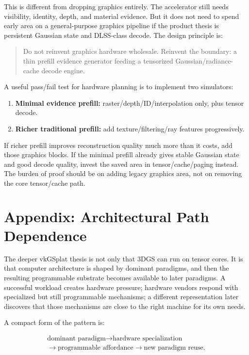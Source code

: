 \documentclass[11pt]{article}
\begin{document}
This is different from dropping graphics entirely. The accelerator still needs
visibility, identity, depth, and material evidence. But it does not need to
spend early area on a general-purpose graphics pipeline if the product thesis
is persistent Gaussian state and DLSS-class decode. The design principle is:

\begin{quote}
Do not reinvent graphics hardware wholesale. Reinvent the boundary: a thin
prefill evidence generator feeding a tensorized Gaussian/radiance-cache decode
engine.
\end{quote}

A useful pass/fail test for hardware planning is to implement two simulators:

\begin{enumerate}
  \item \textbf{Minimal evidence prefill:} raster/depth/ID/interpolation only,
        plus tensor decode.
  \item \textbf{Richer traditional prefill:} add texture/filtering/ray features
        progressively.
\end{enumerate}

If richer prefill improves reconstruction quality much more than it costs, add
those graphics blocks. If the minimal prefill already gives stable Gaussian
state and good decode quality, invest the saved area in tensor/cache/paging
instead. The burden of proof should be on adding legacy graphics area, not on
removing the core tensor/cache path.

\section{Appendix: Architectural Path Dependence}

The deeper vkGSplat thesis is not only that 3DGS can run on tensor cores. It is
that computer architecture is shaped by dominant paradigms, and then the
resulting programmable substrate becomes available to later paradigms. A
successful workload creates hardware pressure; hardware vendors respond with
specialized but still programmable mechanisms; a different representation later
discovers that those mechanisms are close to the right machine for its own
needs.

A compact form of the pattern is:

\[
\begin{gathered}
\text{dominant paradigm}
\rightarrow \text{hardware specialization}\\
\rightarrow \text{programmable affordance}
\rightarrow \text{new paradigm reuse}.
\end{gathered}
\]
\end{document}
